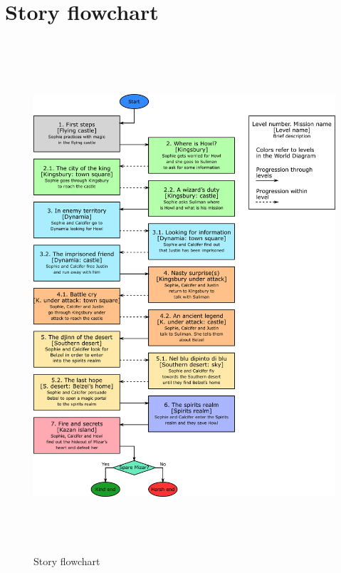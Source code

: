 \section{Story flowchart}

\begin{figure}[H]
  \centering
  \includegraphics[height=19cm]{Images/Diagrams/storyFlowchart}
  \caption{Story flowchart}
\end{figure}
\hspace{0pt} \\ %
